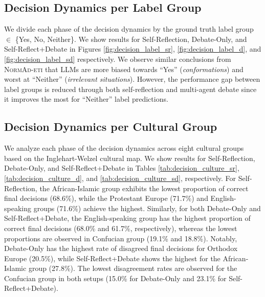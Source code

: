 \documentclass[11pt]{article}
\begin{document}
\subsection{Decision Dynamics per Label Group}
\label{appendix:decision_dynamics_label}
We divide each phase of the decision dynamics by the ground truth label group $\in$ \{Yes, No, Neither\}. We show results for Self-Reflection, Debate-Only, and Self-Reflect+Debate in Figures \ref{fig:decision_label_sr}, \ref{fig:decision_label_d}, and \ref{fig:decision_label_sd} respectively. We observe similar conclusions from \textsc{NormAd-eti} \cite{normad} that LLMs are more biased towards ``Yes'' (\textit{conformations}) and worst at ``Neither'' (\textit{irrelevant situations}). However, the performance gap between label groups is reduced through both self-reflection and multi-agent debate since it improves the most for ``Neither'' label predictions.

% 
% 
% 






\subsection{Decision Dynamics per Cultural Group}
\label{appendix:decision_dynamics_culture}
We analyze each phase of the decision dynamics across eight cultural groups based on the Inglehart-Welzel cultural map. We show results for Self-Reflection, Debate-Only, and Self-Reflect+Debate in Tables \ref{tab:decision_culture_sr}, \ref{tab:decision_culture_d}, and \ref{tab:decision_culture_sd}, respectively. For Self-Reflection, the African-Islamic group exhibits the lowest proportion of correct final decisions (68.6\%), while the Protestant Europe (71.7\%) and English-speaking groups (71.6\%) achieve the highest. Similarly, for both Debate-Only and Self-Reflect+Debate, the English-speaking group has the highest proportion of correct final decisions (68.0\% and 61.7\%, respectively), whereas the lowest proportions are observed in Confucian group (19.1\% and 18.8\%). Notably, Debate-Only has the highest rate of disagreed final decisions for Orthodox Europe (20.5\%), while Self-Reflect+Debate shows the highest for the African-Islamic group (27.8\%). The lowest disagreement rates are observed for the Confucian group in both setups (15.0\% for Debate-Only and 23.1\% for Self-Reflect+Debate).
\end{document}
